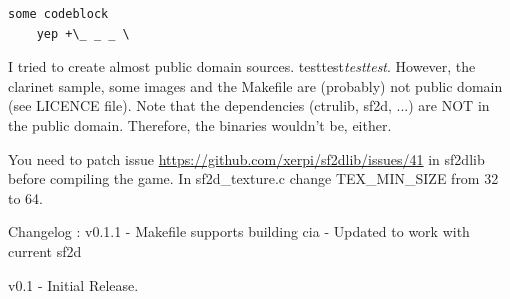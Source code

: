 \begin{verbatim}
some codeblock
	yep +\_ _ _ \
\end{verbatim}


I tried to create almost public domain sources.
testtest\textit{testtest}.
However, the clarinet sample, some images and the Makefile are (probably) not public domain (see LICENCE file).
Note that the dependencies (ctrulib, sf2d, ...) are NOT in the public domain. Therefore, the binaries wouldn't be, either.

You need to patch issue \url{https://github.com/xerpi/sf2dlib/issues/41} in sf2dlib before compiling the game. In sf2d\_texture.c change TEX\_MIN\_SIZE from 32 to 64.

Changelog :
v0.1.1
	- Makefile supports building cia
	- Updated to work with current sf2d

v0.1
	- Initial Release.
